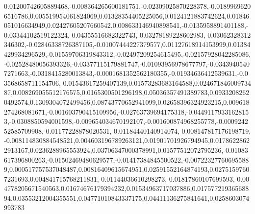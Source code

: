 0.01200742605889468,-0.008364265600181751,-0.02309025870228378,-0.01899696206516786,0.005519954061824069,0.01328354405225056,0.0124121883742624,0.01846051016634949,0.02427605207660542,0.008633146940898541,-0.0135958891401188,-0.03344102519122324,-0.04355516682322743,-0.03278189228602983,-0.03062328312346302,-0.02846338726387105,-0.01007444227379577,0.01127618914153999,0.01384429934296529,-0.01559706319843312,-0.02497209254615495,-0.02157928042285086,-0.02528480056393326,-0.03377115179881747,-0.01093956978677797,-0.03439405407271663,-0.0318415280013843,-0.0001681352562180355,-0.01934636412539631,-0.03568658711154706,-0.01543617259407139,0.01573283683164588,0.02467184600973487,0.008269055512176575,0.0165300501296198,0.05036357491389783,0.09332082620492574,0.1309304072499456,0.08743770652941099,0.02658396324923215,0.009618274268081671,-0.001603790415109956,-0.02763739694175318,-0.04491179331628153,-0.0308850594001598,-0.009654034670192107,-0.001600874968255778,-0.000924252585709908,-0.01177228878020531,-0.01184440140914074,-0.008147817176198719,-0.008114830884548521,0.004603196789263121,0.01901701926794945,0.01786228622913167,0.0236288965553924,0.03706347000378991,0.01577512072795236,-0.01083617396800263,-0.01502469480629577,-0.01417384845500522,-0.007223277606955889,0.000517757537048487,0.00816409615674951,0.02591552164874193,0.02751597607231693,0.004841715768211831,-0.01144036610298273,-0.01817860107699593,-0.004778205671540563,0.01674676179394232,0.01534963717037886,0.01757721936568894,0.03553212004355551,0.04771010843337175,0.04411136275841641,0.0258603074993783
